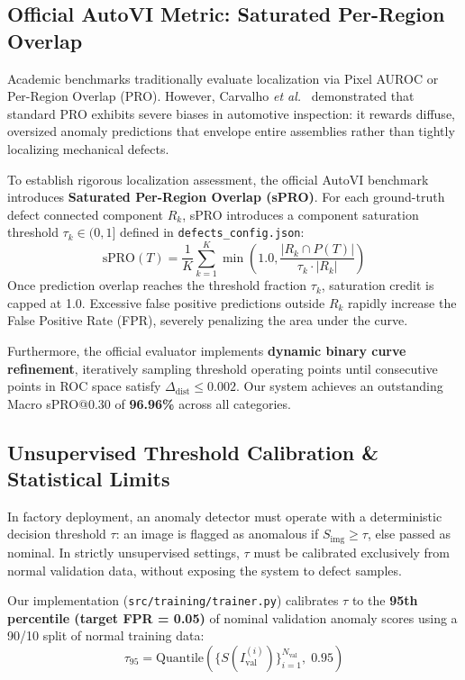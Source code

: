 \documentclass[journal,twocolumn]{IEEEtran}
\begin{document}
\subsection{Official AutoVI Metric: Saturated Per-Region Overlap}
Academic benchmarks traditionally evaluate localization via Pixel AUROC or Per-Region Overlap (PRO). However, Carvalho \textit{et al.}~\cite{carvalho2024autovi} demonstrated that standard PRO exhibits severe biases in automotive inspection: it rewards diffuse, oversized anomaly predictions that envelope entire assemblies rather than tightly localizing mechanical defects.

To establish rigorous localization assessment, the official AutoVI benchmark introduces \textbf{Saturated Per-Region Overlap (sPRO)}. For each ground-truth defect connected component $R_k$, sPRO introduces a component saturation threshold $\tau_k \in (0, 1]$ defined in \texttt{defects\_config.json}:
\begin{equation}
\text{sPRO}(T) = \frac{1}{K} \sum_{k=1}^K \min\left( 1.0, \frac{|R_k \cap P(T)|}{\tau_k \cdot |R_k|} \right)
\end{equation}
Once prediction overlap reaches the threshold fraction $\tau_k$, saturation credit is capped at 1.0. Excessive false positive predictions outside $R_k$ rapidly increase the False Positive Rate (FPR), severely penalizing the area under the curve.

Furthermore, the official evaluator implements \textbf{dynamic binary curve refinement}, iteratively sampling threshold operating points until consecutive points in ROC space satisfy $\Delta_{\text{dist}} \le 0.002$. Our system achieves an outstanding Macro sPRO@0.30 of \textbf{96.96\%} across all categories.

\subsection{Unsupervised Threshold Calibration \& Statistical Limits}
In factory deployment, an anomaly detector must operate with a deterministic decision threshold $\tau$: an image is flagged as anomalous if $S_{\text{img}} \ge \tau$, else passed as nominal. In strictly unsupervised settings, $\tau$ must be calibrated exclusively from normal validation data, without exposing the system to defect samples.

Our implementation (\texttt{src/training/trainer.py}) calibrates $\tau$ to the \textbf{95th percentile (target FPR = 0.05)} of nominal validation anomaly scores using a 90/10 split of normal training data:
\begin{equation}
\tau_{95} = \text{Quantile}\left( \{ S(I_{\text{val}}^{(i)}) \}_{i=1}^{N_{\text{val}}}, \; 0.95 \right)
\end{equation}
\end{document}

